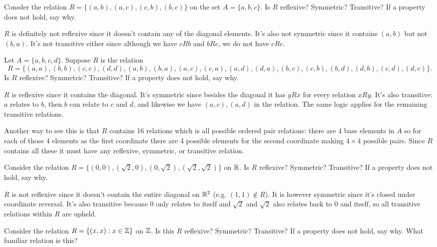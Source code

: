 \documentclass{article}
\begin{document}
\begin{problem}
Consder the relation $R = \{(a, b), (a, c), (c, b), (b, c)\}$ on the set $A = \{a, b, c\}$. Is $R$ reflexive? Symmetric? Transitive? If a property does not hold, say why.
\end{problem}

$R$ is definitely not reflexive since it doesn't contain any of the diagonal elements. It's also not symmetric since it contains $(a, b)$ but not $(b, a)$. It's not transitive either since although we have $cRb$ and $bRc$, we do not have $cRc$.

\begin{problem}
Let $A = \{a, b, c, d\}$. Suppose $R$ is the relation
\[ R = \{(a, a), (b, b), (c, c), (d, d), (a, b), (b, a), (a, c), (c, a), (a, d), (d, a), (b, c), (c, b), (b, d), (d, b), (c, d), (d, c)\}. \]
Is $R$ reflexive? Symmetric? Transitive? If a property does not hold, say why.
\end{problem}

$R$ is reflexive since it contains the diagonal. It's symmetric since besides the diagonal it has $yRx$ for every relation $xRy$. It's also transitive: $a$ relates to $b$, then $b$ can relate to $c$ and $d$, and likewise we have $(a, c), (a, d)$ in the relation. The same logic applies for the remaining transitive relations.

Another way to see this is that $R$ contains 16 relations which is all possible ordered pair relations: there are 4 base elements in $A$ so for each of those 4 elements as the first coordinate there are 4 possible elements for the second coordinate making $4 \times 4$ possible pairs. Since $R$ contains all these it must have any reflexive, symmetric, or transitive relation.

\begin{problem}
Consider the relation $R = \{(0, 0), (\sqrt{2}, 0), (0, \sqrt{2}), (\sqrt{2}, \sqrt{2})\}$ on $\mathbb{R}$. Is $R$ reflexive? Symmetric? Transitive? If a property does not hold, say why.
\end{problem}

$R$ is not reflexive since it doesn't contain the entire diagonal on $\mathbb{R}^2$ (e.g. $(1, 1) \not\in R$). It is however symmetric since it's closed under coordinate reversal. It's also transitive because 0 only relates to itself and $\sqrt{2}$ and $\sqrt{2}$ also relates back to 0 and itself, so all transitive relations within $R$ are upheld.

\begin{problem}
Consider the relation $R = \{(x, x) : x \in \mathbb{Z}\}$ on $\mathbb{Z}$. Is this $R$ reflexive? Symmetric? Transitive? If a property does not hold, say why. What familiar relation is this?
\end{problem}
\end{document}
